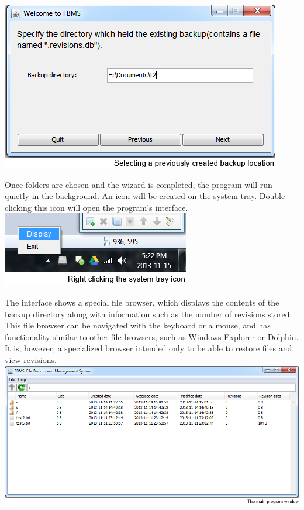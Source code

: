 \documentclass[12pt,a4paper]{article}
\begin{document}
\includegraphics{images/3-oldBackup.png}

Once folders are chosen and the wizard is completed, the program will run quietly in the background. An icon will be created on the system tray. Double clicking this icon will open the program's interface. \\

\includegraphics{images/4-systemTray.png}

The interface shows a special file browser, which displays the contents of the backup directory along with information such as the number of revisions stored. This file browser can be navigated with the keyboard or a mouse, and has functionality similar to other file browsers, such as Windows Explorer or Dolphin. It is, however, a specialized browser intended only to be able to restore files and view revisions. \\

\includegraphics[width=\textwidth]{images/5-mainWindow.png}
\end{document}
